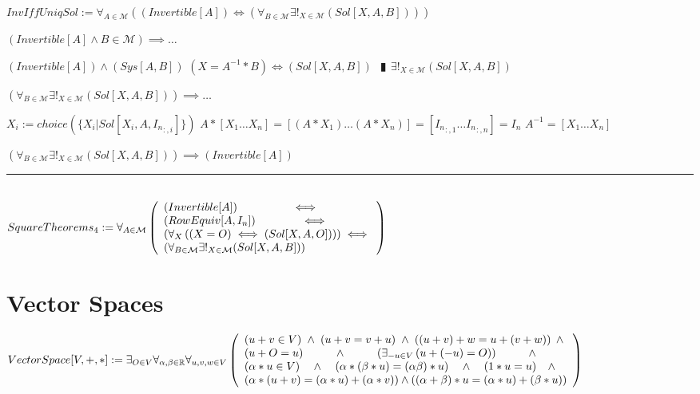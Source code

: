 \documentclass{book}
\newcommand{\abr}{:=}
\newcommand{\pipe}{$\phantom{(}\vrectangleblack\phantom{)}$}
\newcommand{\pr}[1]{\left(#1\right)}
\begin{document}
$InvIffUniqSol \abr \forall_{A \in \mathcal{M}}\pr{(Invertible[A]) \iff \pr{\forall_{B \in \mathcal{M}} \exists!_{X \in \mathcal{M}}(Sol[X, A, B])}}$
\begin{enumerate}
  \lit $(Invertible[A] \land B \in \mathcal{M}) \implies \ldots$
  \begin{enumerate}
    \lit $(Invertible[A]) \land (Sys[A, B])$
    \lit $(X = A^{-1} * B) \iff (Sol[X, A, B])$ \pipe $\exists!_{X \in \mathcal{M}}(Sol[X, A, B])$
  \end{enumerate}
  \lit $\pr{\forall_{B \in \mathcal{M}} \exists!_{X \in \mathcal{M}}(Sol[X, A, B])} \implies \ldots$
  \begin{enumerate}
    \lit $X_i \abr choice(\{X_i | Sol[X_i, A, {I_n}_{:, i}]\})$
    \lit $A * [X_1 \ldots X_n] = [(A * X_1) \ldots (A * X_n)] =  [{I_n}_{:, 1} \ldots {I_n}_{:, n}] = I_n$ \lit $A^{-1} = [X_1 \ldots X_n]$
  \end{enumerate}
  \lit $\pr{\forall_{B \in \mathcal{M}} \exists!_{X \in \mathcal{M}}(Sol[X, A, B])} \implies (Invertible[A])$
\end{enumerate} \vspace{.75mm} \hrule \vspace{.75mm} \ \\ 

$SquareTheorems_4 \abr \forall_{A \in \mathcal{M}}\left(\begin{array}{ll}
  (Invertible[A]) \hfill \iff \hfill \\
  (RowEquiv[A, I_n]) \hfill \iff \hfill \\
  \pr{\forall_{X}\pr{(X = O) \iff (Sol[X, A, O])}} \hfill \iff \hfill \\
  \pr{\forall_{B \in \mathcal{M}} \exists!_{X \in \mathcal{M}}(Sol[X, A, B])}
\end{array}\right)$ \\

\section{Vector Spaces}
$VectorSpace[V, +, *] \abr \exists_{O \in V} \forall_{\alpha ,\beta \in \mathbb{R}} \forall_{u, v, w \in V} \left(\begin{array}{ll}
  (u + v \in V) \hfill \land \hfill (u + v = v + u) \hfill \land \hfill \pr{(u + v) + w = u + (v + w)} \hfill \land \hfill \\
  (u + O = u) \hfill \land \hfill \pr{\exists_{-u \in V}\pr{u + (-u) = O}} \hfill \land \hfill \\
  (\alpha * u \in V) \hfill \land \hfill \pr{\alpha * (\beta * u) = (\alpha \beta) * u} \hfill \land \hfill (1 * u = u) \hfill \land \hfill \\
  \pr{\alpha * (u + v) = (\alpha * u) + (\alpha * v)}  \hfill \land \hfill \pr{(\alpha + \beta) * u = (\alpha * u) + (\beta * u)} \\
\end{array}\right)$
\end{document}
